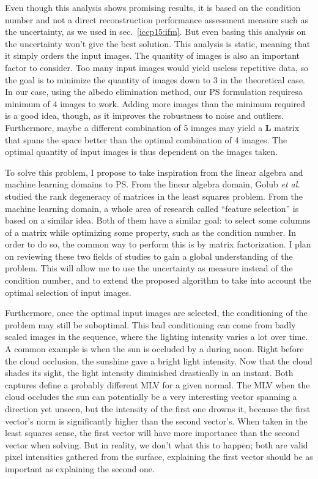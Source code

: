 Even though this analysis shows promising results, it is based on the condition number and not a direct reconstruction performance assessment measure such as the uncertainty, as we used in sec.~\ref{iccp15:ifm}. But even basing this analysis on the uncertainty won't give the best solution. This analysis is static, meaning that it simply orders the input images. The quantity of images is also an important factor to consider. Too many input images would yield useless repetitive data, so the goal is to minimize the quantity of images down to 3 in the theoretical case. In our case, using the albedo elimination method, our PS formulation requiresa minimum of 4 images to work. Adding more images than the minimum required is a good idea, though, as it improves the robustness to noise and outliers. Furthermore, maybe a different combination of 5 images may yield a $\mathbf{L}$ matrix that spans the space better than the optimal combination of 4 images. The optimal quantity of input images is thus dependent on the images taken.

To solve this problem, I propose to take inspiration from the linear algebra and machine learning domains to PS. From the linear algebra domain, Golub \emph{et al.}~\cite{Golub1977} studied the rank degeneracy of matrices in the least squares problem. From the machine learning domain, a whole area of research called ``feature selection'' is based on a similar idea. Both of them have a similar goal: to select some columns of a matrix while optimizing some property, such as the condition number. In order to do so, the common way to perform this is by matrix factorization. I plan on reviewing these two fields of studies to gain a global understanding of the problem. This will allow me to use the uncertainty as measure instead of the condition number, and to extend the proposed algorithm to take into account the optimal selection of input images.

Furthermore, once the optimal input images are selected, the conditioning of the problem may still be suboptimal. This bad conditioning can come from badly scaled images in the sequence, where the lighting intensity varies a lot over time. A common example is when the sun is occluded by a during noon. Right before the cloud occlusion, the sunshine gave a bright light intensity. Now that the cloud shades its sight, the light intensity diminished drastically in an instant. Both captures define a probably different MLV for a given normal. The MLV when the cloud occludes the sun can potentially be a very interesting vector spanning a direction yet unseen, but the intensity of the first one drowns it, because the first vector's norm is significantly higher than the second vector's. When taken in the least squares sense, the first vector will have more importance than the second vector when solving. But in reality, we don't what this to happen; both are valid pixel intensities gathered from the surface, explaining the first vector should be as important as explaining the second one.

